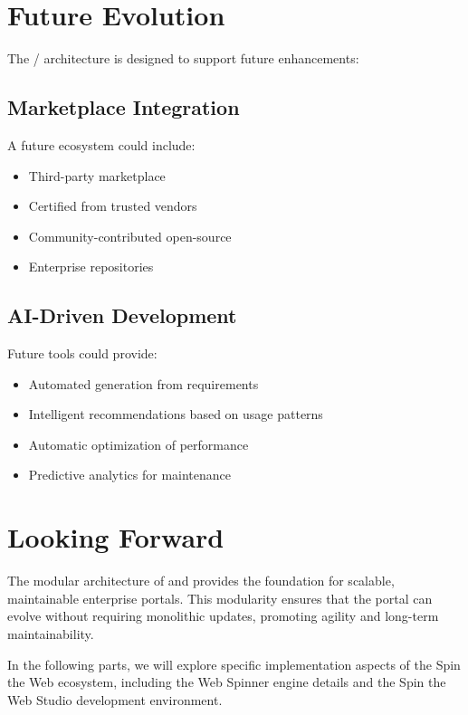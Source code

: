 \section{Future Evolution}
\label{sec:future-evolution}

The \webbase{}/\webbaselet{} architecture is designed to support future enhancements:

\subsection{Marketplace Integration}

A future ecosystem could include:
\begin{itemize}
\item Third-party \webbaselet{} marketplace
\item Certified  from trusted vendors
\item Community-contributed open-source 
\item Enterprise \webbaselet{} repositories
\end{itemize}

\subsection{AI-Driven Development}

Future tools could provide:
\begin{itemize}
\item Automated \webbaselet{} generation from requirements
\item Intelligent \webbaselet{} recommendations based on usage patterns
\item Automatic optimization of \webbaselet{} performance
\item Predictive analytics for \webbaselet{} maintenance
\end{itemize}

\section{Looking Forward}
\label{sec:webbaselets-forward}

The modular architecture of  and  provides the foundation for scalable, maintainable enterprise portals. This modularity ensures that the portal can evolve without requiring monolithic updates, promoting agility and long-term maintainability.

In the following parts, we will explore specific implementation aspects of the Spin the Web ecosystem, including the Web Spinner engine details and the Spin the Web Studio development environment.
